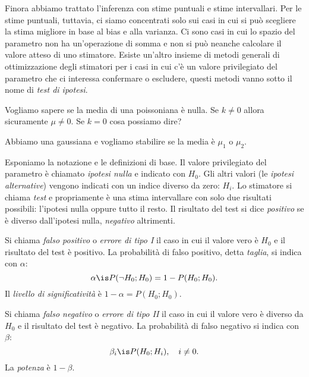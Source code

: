 
Finora abbiamo trattato l'inferenza con stime puntuali e stime intervallari.
Per le stime puntuali, tuttavia,
ci siamo concentrati solo sui casi in cui si può scegliere la stima migliore in base al bias e alla varianza.
Ci sono casi in cui lo spazio del parametro non ha un'operazione di somma
e non si può neanche calcolare il valore atteso di uno stimatore.
Esiste un'altro insieme di metodi generali di ottimizzazione degli stimatori
per i casi in cui c'è un valore privilegiato del parametro che ci interessa confermare o escludere,
questi metodi vanno sotto il nome di \emph{test di ipotesi}.

\begin{example}
	Vogliamo sapere se la media di una poissoniana è nulla.
	Se $k\neq 0$ allora sicuramente $\mu\neq 0$.
	Se $k=0$ cosa possiamo dire?
\end{example}

\begin{example}
	Abbiamo una gaussiana e vogliamo stabilire se la media è $\mu_1$ o $\mu_2$.
\end{example}

Esponiamo la notazione e le definizioni di base.
Il valore privilegiato del parametro è chiamato \emph{ipotesi nulla} e indicato con $H_0$.
Gli altri valori (le \emph{ipotesi alternative}) vengono indicati con un indice diverso da zero: $H_i$.
Lo stimatore si chiama \emph{test} e propriamente è una stima intervallare
con solo due risultati possibili: l'ipotesi nulla oppure tutto il resto.
Il risultato del test si dice \emph{positivo} se è diverso dall'ipotesi nulla,
\emph{negativo} altrimenti.

\begin{definition}
	Si chiama \emph{falso positivo} o \emph{errore di tipo I}
	il caso in cui il valore vero è $H_0$ e il risultato del test è positivo.
	La probabilità di falso positivo, detta \emph{taglia}, si indica con $\alpha$:
	\begin{equation*}
		\alpha
		\is P(\neg H_0;H_0) = 1 - P(H_0;H_0).
	\end{equation*}
	Il \emph{livello di significatività} è $1-\alpha = P(H_0;H_0)$.
\end{definition}

\begin{definition}
	Si chiama \emph{falso negativo} o \emph{errore di tipo II}
	il caso in cui il valore vero è diverso da $H_0$ e il risultato del test è negativo.
	La probabilità di falso negativo si indica con $\beta$:
	\begin{equation*}
		\beta_i
		\is P(H_0;H_i), \quad i \neq 0.
	\end{equation*}
	La \emph{potenza} è $1-\beta$.
\end{definition}

